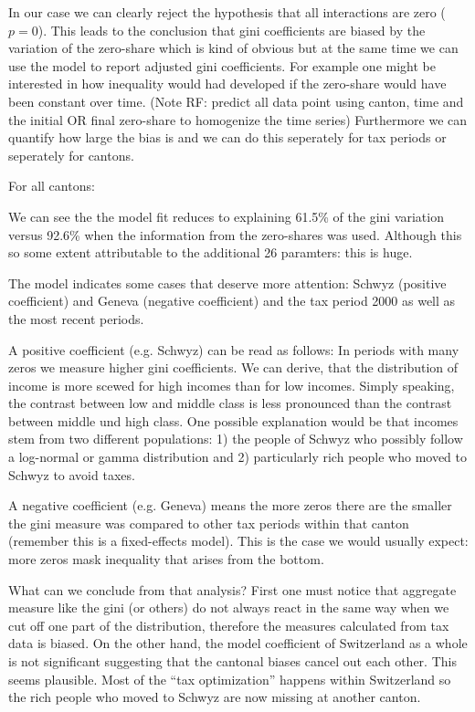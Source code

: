 \documentclass[twoside]{article}\usepackage[]{graphicx}\usepackage[]{color}
\begin{document}
\begin{multicols}{2}
In our case we can clearly reject the hypothesis that all interactions are zero ($p=0$). This leads to the conclusion  that gini coefficients are biased by the variation of the zero-share which is kind of obvious but at the same time we can use the model to report adjusted gini coefficients. For example one might be interested in how inequality would had developed if the zero-share would have been constant over time. (Note RF: predict all data point using canton, time and the initial OR final zero-share to homogenize the time series)
Furthermore we can quantify how large the bias is and we can do this seperately for tax periods or seperately for cantons. 

For all cantons:




We can see the the model fit reduces to explaining 61.5\% of the gini variation versus 92.6\% when the information from the zero-shares was used. Although this so some extent attributable to the additional 26 paramters: this is huge. 

The model indicates some cases that deserve more attention: Schwyz (positive coefficient) and Geneva (negative coefficient) and the tax period 2000 as well as the most recent periods.

A positive coefficient (e.g. Schwyz) can be read as follows: In periods with many zeros we measure higher gini coefficients. We can derive, that the distribution of income is more scewed for high incomes than for low incomes. Simply speaking, the contrast between low and middle class is less pronounced than the contrast between middle und high class. One possible explanation would be that incomes stem from two different populations: 1) the people of Schwyz who possibly follow a log-normal or gamma distribution and 2) particularly rich people who moved to Schwyz to avoid taxes. 

A negative coefficient (e.g. Geneva) means the more zeros there are the smaller the gini measure was compared to other tax periods within that canton (remember this is a fixed-effects model). This is the case we would usually expect: more zeros mask inequality that arises from the bottom.

What can we conclude from that analysis? First one must notice that aggregate measure like the gini (or others) do not always react in the same way when we cut off one part of the distribution, therefore the measures calculated from tax data is biased. On the other hand, the model coefficient of Switzerland as a whole is not significant suggesting that the cantonal biases cancel out each other. This seems plausible. Most of the ``tax optimization'' happens within Switzerland so the rich people who moved to Schwyz are now missing at another canton.


\end{multicols}
\end{document}
